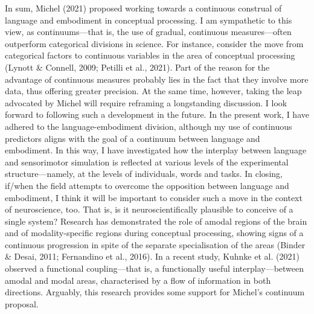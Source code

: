 \documentclass[
  12pt,
  man,floatsintext]{apa7}
\begin{document}
In sum, Michel (2021) proposed working towards a continuous construal of language and embodiment in conceptual processing. I am sympathetic to this view, as continuums---that is, the use of gradual, continuous measures---often outperform categorical divisions in science. For instance, consider the move from categorical factors to continuous variables in the area of conceptual processing (Lynott \& Connell, 2009; Petilli et al., 2021). Part of the reason for the advantage of continuous measures probably lies in the fact that they involve more data, thus offering greater precision. At the same time, however, taking the leap advocated by Michel will require reframing a longstanding discussion. I look forward to following such a development in the future. In the present work, I have adhered to the language-embodiment division, although my use of continuous predictors aligns with the goal of a continuum between language and embodiment. In this way, I have investigated how the interplay between language and sensorimotor simulation is reflected at various levels of the experimental structure---namely, at the levels of individuals, words and tasks. In closing, if/when the field attempts to overcome the opposition between language and embodiment, I think it will be important to consider such a move in the context of neuroscience, too. That is, is it neuroscientifically plausible to conceive of a single system? Research has demonstrated the role of amodal regions of the brain and of modality-specific regions during conceptual processing, showing signs of a continuous progression in spite of the separate specialisation of the areas (Binder \& Desai, 2011; Fernandino et al., 2016). In a recent study, Kuhnke et al. (2021) observed a functional coupling---that is, a functionally useful interplay---between amodal and modal areas, characterised by a flow of information in both directions. Arguably, this research provides some support for Michel's continuum proposal.
\end{document}

